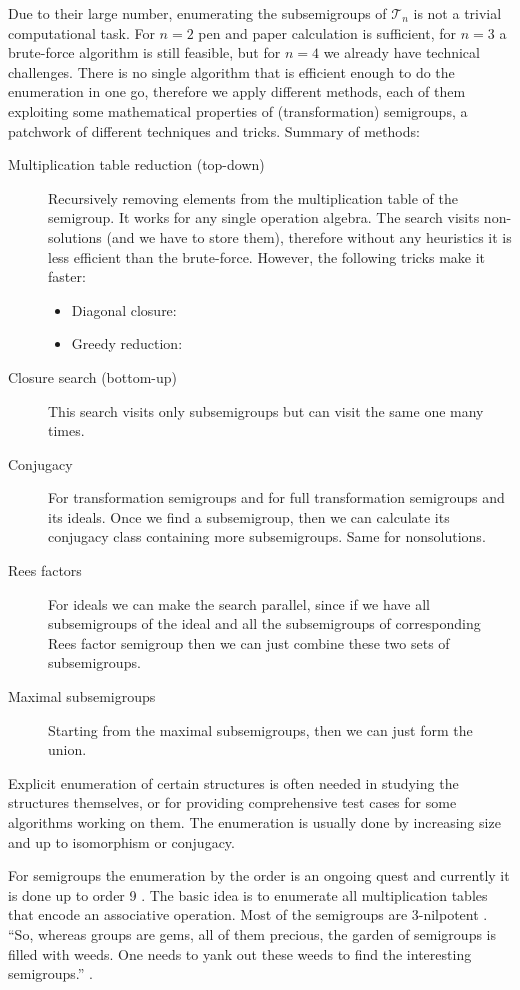 \documentclass{amsart}
\newcommand{\cT}{{\mathcal T}}
\theoremstyle{plain}
\theoremstyle{definition}
\begin{document}
Due to their large number, enumerating the subsemigroups of $\cT_n$ is not a trivial computational task.
For $n=2$ pen and paper calculation is sufficient, for $n=3$ a brute-force algorithm is still feasible, but for $n=4$ we already have technical challenges.
There is no single algorithm that is efficient enough to do the enumeration in one go, therefore we apply different methods, each of them exploiting some mathematical properties of (transformation) semigroups, a patchwork of different techniques and tricks. 
Summary of methods:
\begin{description}
\item[Multiplication table reduction (top-down)] Recursively removing elements from the multiplication table of the semigroup.
It works for any single operation algebra.
The search visits non-solutions (and we have to store them), therefore without any heuristics it is less efficient than the brute-force. However, the following tricks make it faster:
\begin{itemize}
\item Diagonal closure:
\item Greedy reduction:
\end{itemize}

\item[Closure search (bottom-up)] This search visits only subsemigroups but can visit the same one many times.
\item[Conjugacy] For transformation semigroups and for full transformation semigroups and its ideals. Once we find a subsemigroup, then we can calculate its conjugacy class containing more subsemigroups. Same for nonsolutions.
\item[Rees factors] For ideals we can make the search parallel, since if we have all subsemigroups of the ideal and all the subsemigroups of corresponding Rees factor semigroup then we can just combine these two sets of subsemigroups. 
\item[Maximal subsemigroups] Starting from the maximal subsemigroups, then we can just form the union.

\end{description}



Explicit enumeration of certain structures is often needed in studying the structures themselves, or for providing comprehensive test cases for some algorithms working on them.
The enumeration is usually done by increasing size and up to isomorphism or conjugacy. 

For semigroups the enumeration by the order is an ongoing quest and currently it is done up to order 9 \cite{smallsemi}. The basic idea is to enumerate all multiplication tables that encode an associative operation. %
Most of the semigroups are 3-nilpotent \cite{smallsemi}. ``So, whereas groups are
gems, all of them precious, the garden of semigroups is filled with weeds. One
needs to yank out these weeds to find the interesting semigroups.'' \cite{QBook}.
\end{document}
